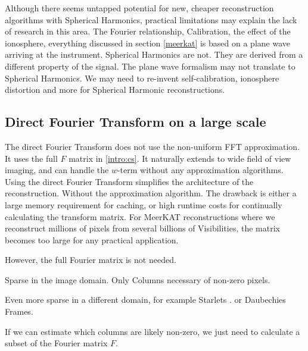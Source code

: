 Although there seems untapped potential for new, cheaper reconstruction algorithms with Spherical Harmonics, practical limitations may explain the lack of research in this area. The Fourier relationship, Calibration, the effect of the ionosphere, everything discussed in section \ref{meerkat} is based on a plane wave arriving at the instrument\cite{thompson1986interferometry, smirnov2011revisiting}. Spherical Harmonics are not. They are derived from a different property of the signal. The plane wave formalism may not translate to Spherical Harmonics. We may need to re-invent self-calibration, ionosphere distortion and more for Spherical Harmonic reconstructions.


\subsection{Direct Fourier Transform on a large scale}
The direct Fourier Transform does not use the non-uniform FFT approximation. It uses the full $F$ matrix in \eqref{intro:cs}. It naturally extends to wide field of view imaging, and can handle the $w$-term without any approximation algorithms. Using the direct Fourier Transform simplifies the architecture of the reconstruction. Without the approximation algorithm. The drawback is either a large memory requirement for caching, or high runtime costs for continually calculating the transform matrix. For MeerKAT reconstructions where we reconstruct millions of pixels from several billions of Visibilities, the matrix becomes too large for any practical application.

However, the full Fourier matrix is not needed.

Sparse in the image domain. Only Columns necessary of non-zero pixels.

Even more sparse in a different domain, for example Starlets \cite{girard2015sparse}. or Daubechies Frames\cite{dabbech2018cygnus}.

If we can estimate which columns are likely non-zero, we just need to calculate a subset of the Fourier matrix $F$.
